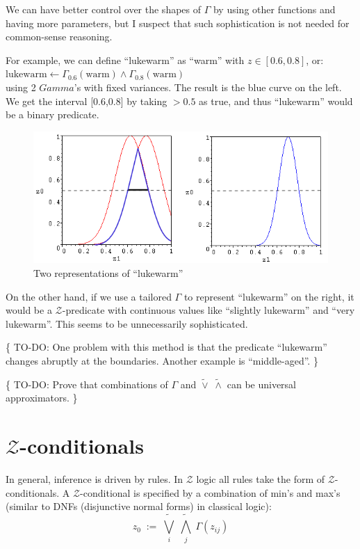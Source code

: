 We can have better control over the shapes of $\Gamma$ by using other functions and having more parameters, but I suspect that such sophistication is not needed for common-sense reasoning.

For example, we can define ``lukewarm'' as ``warm'' with $z \in [0.6,0.8]$, or:\\
\hspace*{1cm} $\mbox{lukewarm} \leftarrow \Gamma_{0.6}(\mbox{warm}) \wedge \Gamma_{0.8}(\mbox{warm})$\\
using 2 $Gamma$'s with fixed variances.  The result is the blue curve on the left.  We get the interval [0.6,0.8] by taking $> 0.5$ as true, and thus ``lukewarm'' would be a binary predicate.
\begin{figure}[H]
\centering
\includegraphics[scale=0.9]{Gamma-for-lukewarm.png}
\caption{Two representations of ``lukewarm''}
\end{figure}
On the other hand, if we use a tailored $\Gamma$ to represent ``lukewarm'' on the right, it would be a $\mathcal{Z}$-predicate with continuous values like ``slightly lukewarm'' and ``very lukewarm''.  This seems to be unnecessarily sophisticated.

\{ TO-DO:  One problem with this method is that the predicate ``lukewarm'' changes abruptly at the boundaries.  Another example is ``middle-aged''.  \}

\{ TO-DO:  Prove that combinations of $\Gamma$ and $\widetilde{\vee} \; \widetilde{\wedge}$ can be universal approximators. \}

\section{$\mathcal{Z}$-conditionals}
\label{sec:Z-conditionals}

In general, inference is driven by rules.  In $\mathcal{Z}$ logic all rules take the form of $\mathcal{Z}$-conditionals.  A $\mathcal{Z}$-conditional is specified by a combination of min's and max's (similar to DNFs (disjunctive normal forms) in classical logic):
\begin{equation}
z_0 \; := \; \widetilde{\bigvee_i} \; \widetilde{\bigwedge_j} \; \Gamma(z_{ij})
\end{equation}

